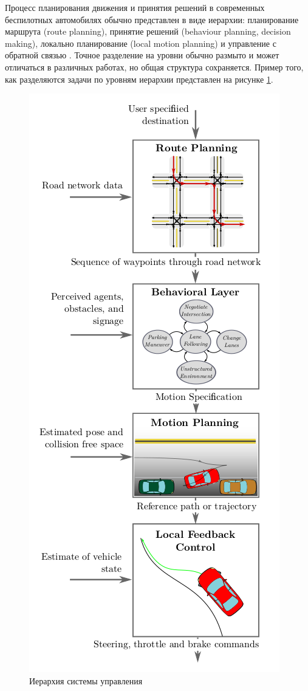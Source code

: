 Процесс планирования движения и принятия решений в современных беспилотных автомобилях обычно представлен в виде
иерархии: планирование маршрута (route planning), принятие решений (behaviour planning, decision making), локально
планирование (local motion planning) и управление с обратной связью \cite{motion_planning_review_2}. Точное разделение на
уровни обычно размыто и может отличаться в различных работах, но общая структура сохраняется. Пример того, как
разделяются задачи по уровням иерархии представлен на рисунке  \ref{img:planning_hierarchy}.

\begin{figure}
    \centering
    \includegraphics[height=\textheight-3cm]{images/planning_hierarchy} %
    \caption{Иерархия системы управления}
    \label{img:planning_hierarchy}
\end{figure}

